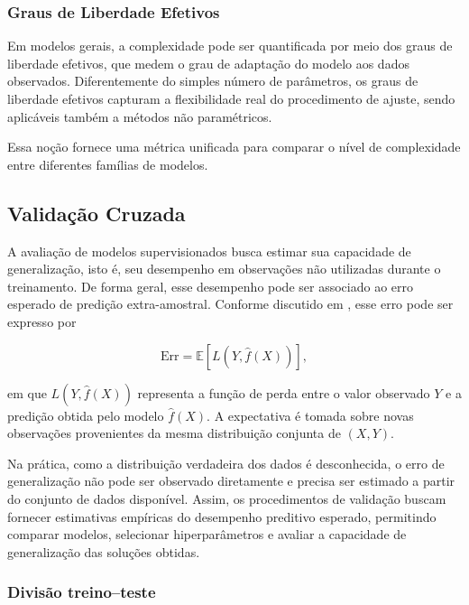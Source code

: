 \subsubsection{Graus de Liberdade Efetivos}

Em modelos gerais, a complexidade pode ser quantificada por meio dos graus de liberdade efetivos, que medem o grau de adaptação do modelo aos dados observados. Diferentemente do simples número de parâmetros, os graus de liberdade efetivos capturam a flexibilidade real do procedimento de ajuste, sendo aplicáveis também a métodos não paramétricos.

Essa noção fornece uma métrica unificada para comparar o nível de complexidade entre diferentes famílias de modelos.




\subsection{Validação Cruzada}
\label{sec:validacao_cruzada}

A avaliação de modelos supervisionados busca estimar sua capacidade de generalização, isto é, seu desempenho em observações não utilizadas durante o treinamento. De forma geral, esse desempenho pode ser associado ao erro esperado de predição extra-amostral. Conforme discutido em \cite{Hastie2009ESL}, esse erro pode ser expresso por

\begin{equation}
\mathrm{Err} = \mathbb{E}[L(Y,\hat{f}(X))],
\label{eq:erro_esperado_generalizacao}
\end{equation}

\noindent em que \(L(Y,\hat{f}(X))\) representa a função de perda entre o valor observado \(Y\) e a predição obtida pelo modelo \(\hat{f}(X)\). A expectativa é tomada sobre novas observações provenientes da mesma distribuição conjunta de \((X,Y)\).

Na prática, como a distribuição verdadeira dos dados é desconhecida, o erro de generalização não pode ser observado diretamente e precisa ser estimado a partir do conjunto de dados disponível. Assim, os procedimentos de validação buscam fornecer estimativas empíricas do desempenho preditivo esperado, permitindo comparar modelos, selecionar hiperparâmetros e avaliar a capacidade de generalização das soluções obtidas.

\subsubsection*{Divisão treino--teste}


